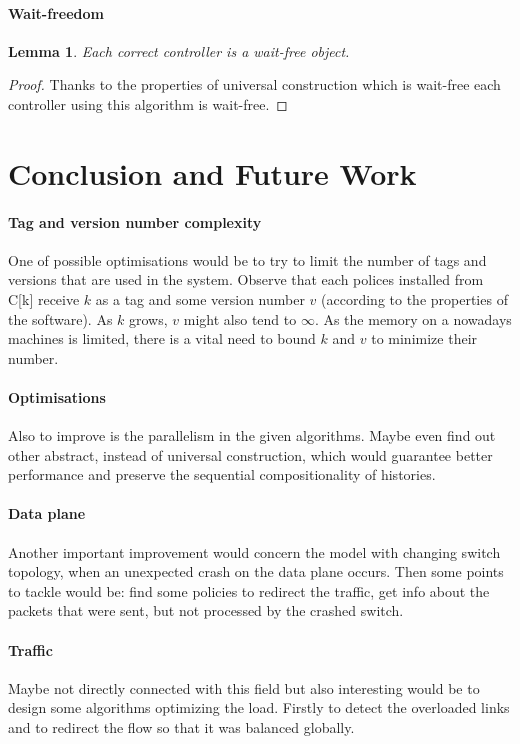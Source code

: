 \documentclass{article}
\newtheorem{lemma}{Lemma}
\theoremstyle{remark}
\begin{document}
\paragraph{Wait-freedom}
\begin{lemma}
Each correct controller is a wait-free object.
\end{lemma}
\begin{proof}
Thanks to the properties of universal construction which is wait-free each controller using this algorithm is wait-free.
\end{proof}
%
%
\section{Conclusion and Future Work}
\paragraph{Tag and version number complexity}
One of possible optimisations would be to try to limit the number of tags and versions that are used in the system. Observe that each polices installed from C[k] receive $k$ as a tag and some version number $v$ (according to the properties of the software). As $k$ grows, $v$ might also tend to $\infty$. As the memory on a nowadays machines is limited, there is a vital need to bound $k$ and $v$ to minimize their number.
\paragraph{Optimisations}
Also to improve is the parallelism in the given algorithms. Maybe even find out other abstract, instead of universal construction, which would guarantee better performance and preserve the sequential compositionality of histories. 
\paragraph{Data plane}
Another important improvement would concern the model with changing switch topology, when an unexpected crash on the data plane occurs. Then some points to tackle would be: find some policies to redirect the traffic, get info about the packets that were sent, but not processed by the crashed switch. 
\paragraph{Traffic} Maybe not directly connected with this field but also interesting would be to design some algorithms optimizing the load. Firstly to detect the overloaded links and to redirect the  flow so that it was balanced globally.



\end{document}

